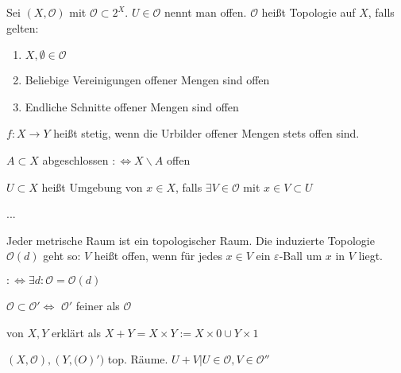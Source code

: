 \begin{defi}[Topologie]
  Sei $(X,\mathcal{O})$ mit $\mathcal{O} \subset 2^X$.
  $U \in \mathcal{O}$ nennt man offen.
  $\mathcal{O}$ heißt Topologie auf $X$, falls gelten:
  \begin{enumerate}
    \item $X, \emptyset \in \mathcal{O}$
    \item Beliebige Vereinigungen offener Mengen sind offen
    \item Endliche Schnitte offener Mengen sind offen
  \end{enumerate}
\end{defi}

\begin{defi}[Stetigkeit]
  $f:X\rightarrow Y$ heißt stetig, wenn die Urbilder offener Mengen stets offen sind.
\end{defi}

\begin{defi}[Abgeschlossen]
  $A \subset X$ abgeschlossen $:\Leftrightarrow X\backslash A$ offen
\end{defi}
\begin{defi}[Umgebung]
  $U \subset X$ heißt Umgebung von $x\in X$, falls
  $\exists V\in \mathcal{O}$ mit $x\in V \subset U$
\end{defi}
\begin{defi}
  ...
\end{defi}

\begin{defi}
  Jeder metrische Raum ist ein topologischer Raum.
  Die induzierte Topologie $\mathcal{O}(d)$ geht so: $V$ heißt offen,
  wenn für jedes $x\in V$ ein $\varepsilon$-Ball um $x$ in $V$ liegt.
\end{defi}
\begin{defi}
  $:\Leftrightarrow \exists d: \mathcal{O} = \mathcal{O}(d)$
\end{defi}

\begin{defi}
  $\mathcal{O} \subset \mathcal{O}' \Leftrightarrow$
  $\mathcal{O}'$ feiner als $\mathcal{O}$
\end{defi}

\begin{defi}
  von $X, Y$ erklärt als
  $X+Y = X\times Y:= X\times {0} \cup Y\times {1}$
\end{defi}

\begin{defi}
  $(X,\mathcal{O}), (Y,\mathcal(O)')$ top. Räume.
  ${U+V | U \in \mathcal{O}, V \in \mathcal{O}''}$
\end{defi}

